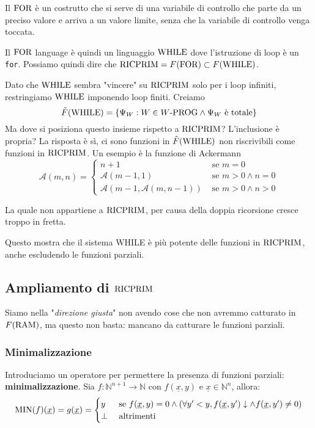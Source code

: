 Il $\text{FOR}$ è un costrutto che si serve di una variabile di controllo che parte da un preciso valore e arriva a un valore limite, senza che la variabile di controllo venga toccata.

Il $\text{FOR}$ language è quindi un linguaggio $\text{WHILE}$ dove l'istruzione di loop è un \texttt{for}. Possiamo quindi dire che $\text{RICPRIM} = F(\text{FOR}) \subset F(\text{WHILE})$.

Dato che $\text{WHILE}$ sembra "vincere" su $\text{RICPRIM}$ solo per i loop infiniti, restringiamo $\text{WHILE}$ imponendo loop finiti. Creiamo
$$ \tilde F (\text{WHILE}) = \{ \Psi_W: W \in W\text{-PROG} \wedge \Psi_W \text{ è totale}\}$$
Ma dove si posiziona questo insieme rispetto a $\text{RICPRIM}$? L'inclusione è propria? La risposta è sì, ci sono funzioni in $\tilde F (\text{WHILE})$ non riscrivibili come funzioni in $\text{RICPRIM}$. Un esempio è la funzione di Ackermann
$$ 
\mathcal{A} (m,n) = \begin{cases}
	n + 1 & \text{ se } m = 0 \\
	\mathcal{A}(m-1, 1) & \text{ se } m > 0 \wedge n = 0 \\
	\mathcal{A}(m-1, \mathcal{A}(m, n-1)) & \text{ se } m > 0 \wedge n > 0
\end{cases}
$$

La quale non appartiene a $\text{RICPRIM}$, per causa della doppia ricorsione cresce troppo in fretta.

Questo mostra che il sistema WHILE è più potente delle funzioni in $\text{RICPRIM}$, anche escludendo le funzioni parziali.

\subsection{Ampliamento di $\text{RICPRIM}$}
Siamo nella "\textit{direzione giusta}" non avendo cose che non avremmo catturato in $F(\text{RAM})$, ma questo non basta: mancano da catturare le funzioni parziali.

\begin{center}
	\scalebox{0.8}{}
\end{center}

\subsubsection{Minimalizzazione}

Introduciamo un operatore per permettere la presenza di funzioni parziali: \textbf{minimalizzazione}. Sia $f: \mathbb{N}^{n+1} \rightarrow \mathbb{N}$ con $f(\underline{x}, y)$ e $\underline{x} \in \mathbb{N}^n$, allora: 
$$
\operatorname{MIN} (f) (\underline{x}) = g(\underline{x}) = \begin{cases}
	y & \text{ se } f(\underline{x}, y) = 0 \wedge (\forall y' < y, f(\underline{x}, y') \downarrow \wedge f(\underline{x}, y') \neq 0) \\
	\bot & \text{ altrimenti}
\end{cases}
$$

